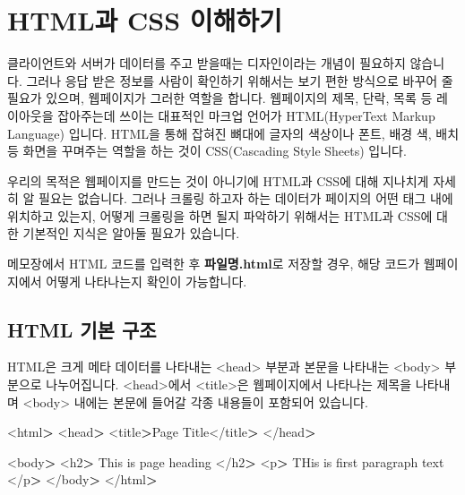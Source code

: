 \documentclass[12pt,]{book}
\newenvironment{Shaded}{\begin{snugshade}}{\end{snugshade}}
\newcommand{\NormalTok}[1]{#1}
\newcommand{\OperatorTok}[1]{\textcolor[rgb]{0.81,0.36,0.00}{\textbf{#1}}}
\begin{document}
\hypertarget{html-css-}{%
\section{HTML과 CSS 이해하기}\label{html-css-}}

클라이언트와 서버가 데이터를 주고 받을때는 디자인이라는 개념이 필요하지 않습니다. 그러나 응답 받은 정보를 사람이 확인하기 위해서는 보기 편한 방식으로 바꾸어 줄 필요가 있으며, 웹페이지가 그러한 역할을 합니다. 웹페이지의 제목, 단락, 목록 등 레이아웃을 잡아주는데 쓰이는 대표적인 마크업 언어가 HTML(HyperText Markup Language) 입니다. HTML을 통해 잡혀진 뼈대에 글자의 색상이나 폰트, 배경 색, 배치 등 화면을 꾸며주는 역할을 하는 것이 CSS(Cascading Style Sheets) 입니다.

우리의 목적은 웹페이지를 만드는 것이 아니기에 HTML과 CSS에 대해 지나치게 자세히 알 필요는 없습니다. 그러나 크롤링 하고자 하는 데이터가 페이지의 어떤 태그 내에 위치하고 있는지, 어떻게 크롤링을 하면 될지 파악하기 위해서는 HTML과 CSS에 대한 기본적인 지식은 알아둘 필요가 있습니다.

메모장에서 HTML 코드를 입력한 후 \textbf{파일명.html}로 저장할 경우, 해당 코드가 웹페이지에서 어떻게 나타나는지 확인이 가능합니다.

\hypertarget{html--}{%
\subsection{HTML 기본 구조}\label{html--}}

HTML은 크게 메타 데이터를 나타내는 \textless{}head\textgreater{} 부분과 본문을 나타내는 \textless{}body\textgreater{} 부분으로 나누어집니다. \textless{}head\textgreater{}에서 \textless{}title\textgreater{}은 웹페이지에서 나타나는 제목을 나타내며 \textless{}body\textgreater{} 내에는 본문에 들어갈 각종 내용들이 포함되어 있습니다.

\begin{Shaded}
\begin{Highlighting}[]
\NormalTok{<html}\OperatorTok{>}
\NormalTok{<head}\OperatorTok{>}
\NormalTok{<title}\OperatorTok{>}\NormalTok{Page Title</title}\OperatorTok{>}
\NormalTok{</head}\OperatorTok{>}

\NormalTok{<body}\OperatorTok{>}
\NormalTok{<h2}\OperatorTok{>}\NormalTok{ This is page heading </h2}\OperatorTok{>}
\NormalTok{<p}\OperatorTok{>}\NormalTok{ THis is first paragraph text </p}\OperatorTok{>}
\NormalTok{</body}\OperatorTok{>}
\NormalTok{</html}\OperatorTok{>}
\end{Highlighting}
\end{Shaded}
\end{document}
